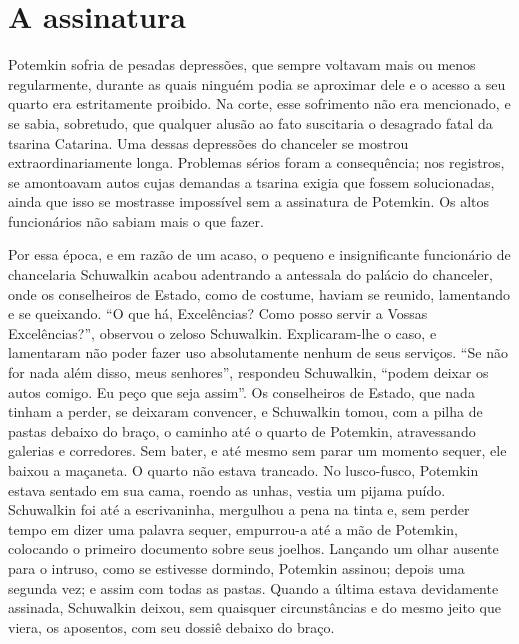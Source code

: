 \section{A assinatura }

Potemkin sofria de pesadas depressões, que sempre voltavam mais ou menos
regularmente, durante as quais ninguém podia se aproximar dele e o
acesso a seu quarto era estritamente proibido. Na corte, esse sofrimento
não era mencionado, e se sabia, sobretudo, que qualquer alusão ao fato
suscitaria o desagrado fatal da tsarina Catarina. Uma dessas depressões
do chanceler se mostrou extraordinariamente longa. Problemas sérios
foram a consequência; nos registros, se amontoavam autos cujas demandas
a tsarina exigia que fossem solucionadas, ainda que isso se mostrasse
impossível sem a assinatura de Potemkin. Os altos funcionários não
sabiam mais o que fazer.

Por essa época, e em razão de um acaso, o pequeno e insignificante
funcionário de chancelaria Schuwalkin acabou adentrando a antessala do
palácio do chanceler, onde os conselheiros de Estado, como de costume,
haviam se reunido, lamentando e se queixando. ``O que há, Excelências?
Como posso servir a Vossas Excelências?'', observou o zeloso Schuwalkin.
Explicaram-lhe o caso, e lamentaram não poder fazer uso absolutamente
nenhum de seus serviços. ``Se não for nada além disso, meus senhores'',
respondeu Schuwalkin, ``podem deixar os autos comigo. Eu peço que seja
assim''. Os conselheiros de Estado, que nada tinham a perder, se
deixaram convencer, e Schuwalkin tomou, com a pilha de pastas debaixo do
braço, o caminho até o quarto de Potemkin, atravessando galerias e
corredores. Sem bater, e até mesmo sem parar um momento sequer, ele
baixou a maçaneta. O quarto não estava trancado. No lusco-fusco,
Potemkin estava sentado em sua cama, roendo as unhas, vestia um pijama
puído. Schuwalkin foi até a escrivaninha, mergulhou a pena na tinta e,
sem perder tempo em dizer uma palavra sequer, empurrou-a até a mão de
Potemkin, colocando o primeiro documento sobre seus joelhos. Lançando um
olhar ausente para o intruso, como se estivesse dormindo, Potemkin
assinou; depois uma segunda vez; e assim com todas as pastas. Quando a
última estava devidamente assinada, Schuwalkin deixou, sem quaisquer
circunstâncias e do mesmo jeito que viera, os aposentos, com seu dossiê
debaixo do braço.

